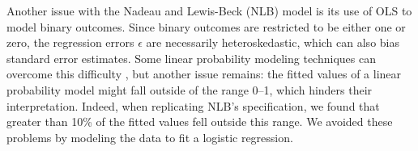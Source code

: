 \documentclass[11pt]{article}
\begin{document}
Another issue with the Nadeau and Lewis-Beck (NLB) model is its use of OLS to model binary outcomes. Since binary outcomes are restricted to be either one or zero, the regression errors $\epsilon$ are necessarily heteroskedastic, which can also bias standard error estimates. Some linear probability modeling techniques can overcome this difficulty \citep[see, e.g.][ sec. 4.6]{agresti2002categorical}, but another issue remains: the fitted values of a linear probability model might fall outside of the range 0--1, which hinders their interpretation. Indeed, when replicating NLB's specification, we found that greater than 10\% of the fitted values fell outside this range. We avoided these problems by modeling the data to fit a logistic regression.%
\end{document}
